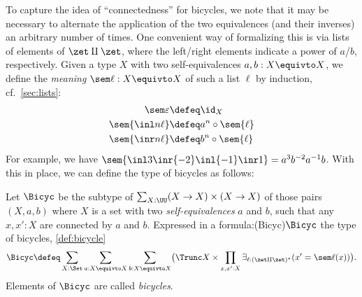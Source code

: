 To capture the idea of ``connectedness'' for bicycles,
we note that it may be necessary to alternate the
application of the two equivalences
(and their inverses) an arbitrary number of times.
One convenient way of formalizing this is via
lists of elements of $\zet\amalg\zet$,
where the left/right elements indicate a power of $a$/$b$,
respectively.
Given a type $X$ with two self-equivalences $a,b:X\equivto X$,
we define the \emph{meaning} $\sem\ell : X \equivto X$
of such a list $\ell$ by induction, cf.~\cref{sec:lists}:
\begin{align*}
  \sem\varepsilon &\defeq \id_X \\
  \sem{\inl n\ell} &\defeq a^n\circ \sem{\ell} \\
  \sem{\inr n\ell} &\defeq b^n \circ \sem{\ell}
\end{align*}
For example, we have $\sem{\inl 3\inr{-2}\inl{-1}\inr 1} = a^3b^{-2}a^{-1}b$.
With this in place, we can define the type of bicycles
as follows:

\begin{definition}\label{def:bicycle}
  Let $\Bicyc$ be the subtype of $\sum_{X:\UU}(X\to X)\times(X\to X)$
  of those pairs $(X,a,b)$ where $X$ is a \emph{\nonempty} set with two
  \emph{self-equivalences} $a$ and $b$,
  such that any $x,x':X$ are connected by $a$ and $b$.
  Expressed in a formula:\glossary(Bicyc){$\protect\Bicyc$}%
  {the type of bicycles, \cref{def:bicycle}}
  \[
    \Bicyc \defeq \sum_{X:\Set}\sum_{a:X\equivto X}\sum_{b:X\equivto X}
    \bigl( {\Trunc X} \times
    \prod_{x,x':X}\exists_{\ell:(\zet\amalg\zet)^*}(x'=\sem\ell(x))\bigr).
  \]
  Elements of $\Bicyc$ are called \emph{bicycles}.
\end{definition}

